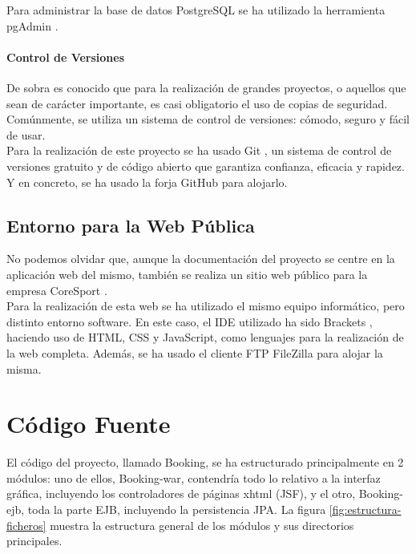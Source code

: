 Para administrar la base de datos PostgreSQL se ha utilizado la herramienta pgAdmin \cite{pgAdmin}.

\paragraph*{Control de Versiones}

De sobra es conocido que para la realización de grandes proyectos, o aquellos que sean de carácter importante, es casi obligatorio el uso de copias de seguridad. Comúnmente, se utiliza un sistema de control de versiones: cómodo, seguro y fácil de usar.\\

Para la realización de este proyecto se ha usado Git \cite{Git}, un sistema de control de versiones gratuito y de código abierto que garantiza confianza, eficacia y rapidez. Y en concreto, se ha usado la forja GitHub \cite{GitHub} para alojarlo.

\subsection{Entorno para la Web Pública}

No podemos olvidar que, aunque la documentación del proyecto se centre en la aplicación web del mismo, también se realiza un sitio web público para la empresa CoreSport \cite{CoreSport}.\\

Para la realización de esta web se ha utilizado el mismo equipo informático, pero distinto entorno software. En este caso, el IDE utilizado ha sido Brackets \cite{Brackets}, haciendo uso de HTML, CSS y JavaScript, como lenguajes para la realización de la web completa. Además, se ha usado el cliente FTP FileZilla \cite{FileZilla} para alojar la misma.


\section{Código Fuente}

El código del proyecto, llamado Booking, se ha estructurado principalmente en 2 módulos: uno de ellos, Booking-war, contendría todo lo relativo a la interfaz gráfica, incluyendo los controladores de páginas xhtml (JSF), y el otro, Booking-ejb, toda la parte EJB, incluyendo la persistencia JPA. La figura \ref{fig:estructura-ficheros} muestra la estructura general de los módulos y sus directorios principales. 

